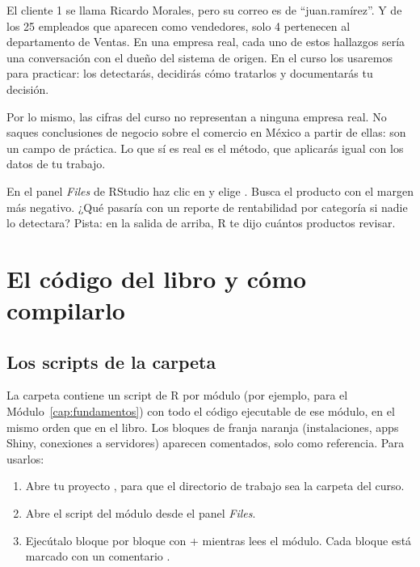 El cliente 1 se llama Ricardo Morales, pero su correo es de ``juan.ramírez''.
Y de los 25 empleados que aparecen como vendedores, solo 4 pertenecen al
departamento de Ventas. En una empresa real, cada uno de estos hallazgos
sería una conversación con el dueño del sistema de origen. En el curso los
usaremos para practicar: los detectarás, decidirás cómo tratarlos y
documentarás tu decisión.

\begin{advertencia}
Por lo mismo, las cifras del curso no representan a ninguna empresa real.
No saques conclusiones de negocio sobre el comercio en México a partir de
ellas: son un campo de práctica. Lo que sí es real es el método, que
aplicarás igual con los datos de tu trabajo.
\end{advertencia}

\begin{hazlotu}
En el panel \textit{Files} de RStudio haz clic en
 y elige . Busca el
producto con el margen más negativo. ¿Qué pasaría con un reporte de
rentabilidad por categoría si nadie lo detectara? Pista: en la salida de
arriba, R te dijo cuántos productos revisar.
\end{hazlotu}

\section{El código del libro y cómo compilarlo}
\label{sec:m0-codigo}

\subsection{Los scripts de la carpeta \texorpdfstring{}{codigo/}}

La carpeta  contiene un script de R por módulo (por
ejemplo,  para el Módulo~\ref{cap:fundamentos})
con todo el código ejecutable de ese módulo, en el mismo orden que en el libro.
Los bloques de franja naranja (instalaciones, apps Shiny, conexiones a
servidores) aparecen comentados, solo como referencia. Para usarlos:

\begin{enumerate}
  \item Abre tu proyecto , para que el
        directorio de trabajo sea la carpeta del curso.
  \item Abre el script del módulo desde el panel \textit{Files}.
  \item Ejecútalo bloque por bloque con  +  mientras
        lees el módulo. Cada bloque está marcado con un comentario
        .
\end{enumerate}

